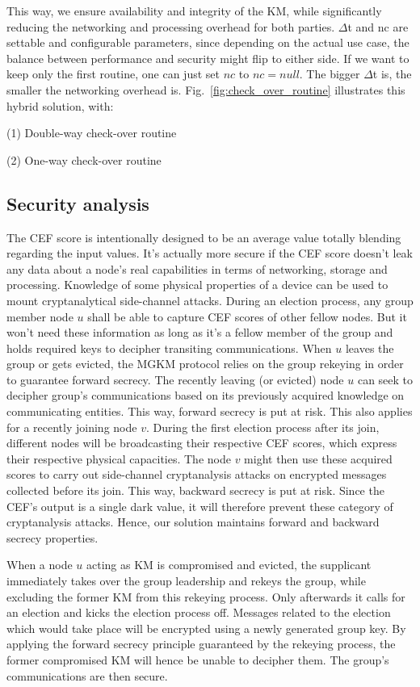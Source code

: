 This way, we ensure availability and integrity of the KM, while significantly reducing the networking and processing overhead for both parties. $\Delta$t and nc are settable and configurable parameters, since depending on the actual use case, the balance between performance and security might flip to either side. If we want to keep only the first routine, one can just set $nc$ to $nc = null$. The bigger $\Delta$t is, the smaller the networking overhead is. Fig.~\ref{fig:check_over_routine} illustrates this hybrid solution, with:

\quad(1) Double-way check-over routine

\quad(2) One-way check-over routine

\subsection{Security analysis}

The CEF score is intentionally designed to be an average value totally blending regarding the input values. It’s actually more secure if the CEF score doesn’t leak any data about a node’s real capabilities in terms of networking, storage and processing. Knowledge of some physical properties of a device can be used to mount cryptanalytical side-channel attacks. During an election process, any group member node $u$ shall be able to capture CEF scores of other fellow nodes. But it won’t need these information as long as it’s a fellow member of the group and holds required keys to decipher transiting communications. When $u$ leaves the group or gets evicted, the MGKM protocol relies on the group rekeying in order to guarantee forward secrecy. The recently leaving (or evicted) node $u$ can seek to decipher group’s communications based on its previously acquired knowledge on communicating entities. This way, forward secrecy is put at risk. This also applies for a recently joining node $v$. During the first election process after its join, different nodes will be broadcasting their respective CEF scores, which express their respective physical capacities. The node $v$ might then use these acquired scores to carry out side-channel cryptanalysis attacks on encrypted messages collected before its join. This way, backward secrecy is put at risk. Since the CEF’s output is a single dark value, it will therefore prevent these category of cryptanalysis attacks. Hence, our solution maintains forward and backward secrecy properties.

When a node $u$ acting as KM is compromised and evicted, the supplicant immediately takes over the group leadership and rekeys the group, while excluding the former KM from this rekeying process. Only afterwards it calls for an election and kicks the election process off. Messages related to the election which would take place will be encrypted using a newly generated group key. By applying the forward secrecy principle guaranteed by the rekeying process, the former compromised KM will hence be unable to decipher them. The group’s communications are then secure.

